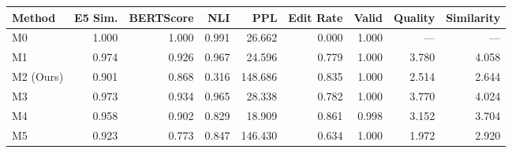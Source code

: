 \begin{tabular}{lrrrrrrrr}
\toprule
Method & E5 Sim. & BERTScore & NLI & PPL & Edit Rate & Valid & Quality & Similarity \\
\midrule
M0 & 1.000 & 1.000 & 0.991 & 26.662 & 0.000 & 1.000 & --- & --- \\
M1 & 0.974 & 0.926 & 0.967 & 24.596 & 0.779 & 1.000 & 3.780 & 4.058 \\
M2 (Ours) & 0.901 & 0.868 & 0.316 & 148.686 & 0.835 & 1.000 & 2.514 & 2.644 \\
M3 & 0.973 & 0.934 & 0.965 & 28.338 & 0.782 & 1.000 & 3.770 & 4.024 \\
M4 & 0.958 & 0.902 & 0.829 & 18.909 & 0.861 & 0.998 & 3.152 & 3.704 \\
M5 & 0.923 & 0.773 & 0.847 & 146.430 & 0.634 & 1.000 & 1.972 & 2.920 \\
\bottomrule
\end{tabular}
